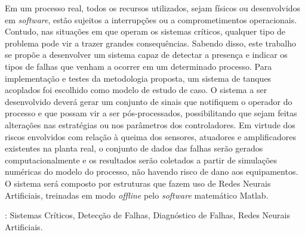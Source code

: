 Em um processo real, todos os recursos utilizados, sejam físicos ou
desenvolvidos em {\it software}, estão sujeitos a interrupções ou a
comprometimentos operacionais. Contudo, nas situações em que operam os sistemas
críticos, qualquer tipo de problema pode vir a trazer grandes consequências.
Sabendo disso, este trabalho se propõe a desenvolver um sistema capaz de
detectar a presença e indicar os tipos de falhas que venham a ocorrer em um
determinado processo. Para implementação e testes da metodologia proposta, um
sistema de tanques acoplados foi escolhido como modelo de estudo de caso. O
sistema a ser desenvolvido deverá gerar um conjunto de sinais que notifiquem o
operador do processo e que possam vir a ser pós-processados, possibilitando que
sejam feitas alterações nas estratégias ou nos parâmetros dos controladores. Em
virtude dos riscos envolvidos com relação à queima dos sensores, atuadores e
amplificadores existentes na planta real, o conjunto de dados das falhas serão
gerados computacionalmente e os resultados serão coletados a partir de
simulações numéricas do modelo do processo, não havendo risco de dano aos
equipamentos. O sistema será composto por estruturas que fazem uso de Redes
Neurais Artificiais, treinadas em modo {\it offline} pelo {\it software}
matemático Matlab\reg.

\vspace{1.5ex}

: Sistemas Críticos, Detecção de Falhas, Diagnóstico de
Falhas, Redes Neurais Artificiais.
